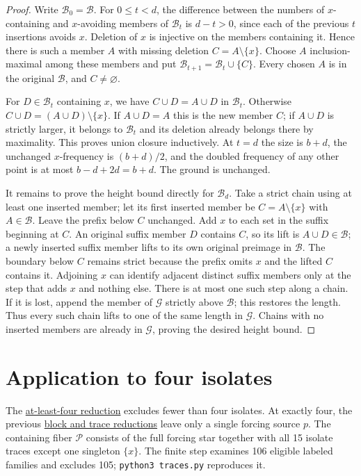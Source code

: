 \documentclass[11pt,letterpaper]{article}
\begin{document}
\begin{proof}
Write \(\mathcal B_0=\mathcal B\). For \(0\le t<d\), the difference
between the numbers of \(x\)-containing and \(x\)-avoiding members of
\(\mathcal B_t\) is \(d-t>0\), since each of the previous \(t\) insertions
avoids \(x\). Deletion of \(x\) is injective on the members containing
it. Hence there is such a member \(A\) with missing deletion
\(C=A\setminus\{x\}\). Choose \(A\) inclusion-maximal among these members
and put \(\mathcal B_{t+1}=\mathcal B_t\cup\{C\}\). Every chosen \(A\)
is in the original \(\mathcal B\), and \(C\ne\varnothing\).

For \(D\in\mathcal B_t\) containing \(x\), we have \(C\cup D=A\cup D\)
in \(\mathcal B_t\). Otherwise \(C\cup D=(A\cup D)\setminus\{x\}\).
If \(A\cup D=A\) this is the new member \(C\); if \(A\cup D\) is
strictly larger, it belongs to \(\mathcal B_t\) and its deletion
already belongs there by maximality. This proves union closure
inductively. At \(t=d\) the size is \(b+d\), the unchanged
\(x\)-frequency is \((b+d)/2\), and the doubled frequency of any
other point is at most \(b-d+2d=b+d\). The ground is unchanged.

It remains to prove the height bound directly for \(\mathcal B_d\).
Take a strict chain using at least one inserted member; let its first
inserted member be \(C=A\setminus\{x\}\) with \(A\in\mathcal B\).
Leave the prefix below \(C\) unchanged. Add \(x\) to each set in
the suffix beginning at \(C\). An original suffix member \(D\)
contains \(C\), so its lift is \(A\cup D\in\mathcal B\);
a newly inserted suffix member lifts to its own original preimage
in \(\mathcal B\). The boundary below \(C\) remains strict because
the prefix omits \(x\) and the lifted \(C\) contains it.
Adjoining \(x\) can identify adjacent distinct suffix members
only at the step that adds \(x\) and nothing else. There is at most
one such step along a chain. If it is lost, append the member of
\(\mathcal G\) strictly above \(\mathcal B\); this restores the
length. Thus every such chain lifts to one of the same length
in \(\mathcal G\). Chains with no inserted members are already in
\(\mathcal G\), proving the desired height bound.
\end{proof}

\section{Application to four isolates}
The \href{https://github.com/Aafimalek/novel-discoveries/tree/2d50235bd73e18b1c1371f96dd7fc3540514e0ee/frankl-height-six/verification/at-least-four-isolates}{at-least-four reduction}
excludes fewer than four isolates. At exactly four, the previous
\href{https://github.com/Aafimalek/novel-discoveries/tree/931f364753a6e70cc6b093e09b42e473134beb04/frankl-height-six/verification/exactly-four-isolates}{block and trace reductions}
leave only a single forcing source \(p\). The containing fiber
\(\mathcal P\) consists of the full forcing star together with
all 15 isolate traces except one singleton \(\{x\}\).
The finite step examines 106 eligible labeled families and
excludes 105; \texttt{python3 traces.py} reproduces it.
\end{document}
